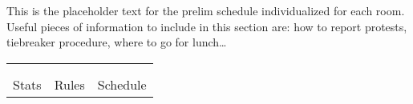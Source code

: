 \documentclass{article}%
\begin{document}
\vspace*{16pt}%
\linebreak%
This is the placeholder text for the prelim schedule individualized for each room. Useful pieces of information to include in this section are: how to report protests, tiebreaker procedure, where to go for lunch…%
\vspace*{30pt}%
\newline%
%
\begin{tabularx}{\textwidth}{YYY}%
  &  &  \\%
\\%
Stats&Rules&Schedule\\%
\end{tabularx}%
\newpage%
\end{document}
